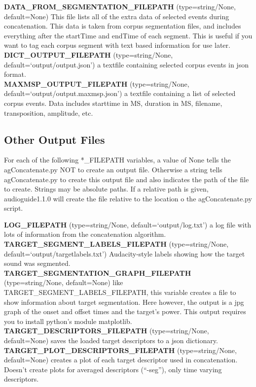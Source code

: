 \documentclass{article}
\newcommand{\optEntry}[4]{\textbf{#1} (type={\color{red}#2}, default={\color{ForestGreen}#3}) #4\hspace{0.5em}\\}
\newcommand{\ag}{audioguide1.1.0\xspace}
\begin{document}
\begin{spacing}{1.2}
\optEntry{DATA\_FROM\_SEGMENTATION\_FILEPATH}{string/None}{None}{This file lists all of the extra data of selected events during concatenation.  This data is taken from corpus segmentation files, and includes everything after the startTime and endTime of each segment.  This is useful if you want to tag each corpus segment with text based information for use later.}

\optEntry{DICT\_OUTPUT\_FILEPATH}{string/None}{`output/output.json'}{a textfile containing selected corpus events in json format.}

\optEntry{MAXMSP\_OUTPUT\_FILEPATH}{string/None}{`output/output.maxmsp.json'}{a textfile containing a list of selected corpus events.  Data includes starttime in MS, duration in MS, filename, transposition, amplitude, etc.}


\subsection{Other Output Files}\label{otheroutputfiles}
For each of the following *\_FILEPATH variables, a value of None tells the agConcatenate.py NOT to create an output file.  Otherwise a string tells agConcatenate.py to create this output file and also indicates the path of the file to create.  Strings may be absolute paths.  If a relative path is given, \ag will create the file relative to the location o the agConcatenate.py script.

\optEntry{LOG\_FILEPATH}{string/None}{`output/log.txt'}{a log file with lots of information from the concatenation algorithm.}

\optEntry{TARGET\_SEGMENT\_LABELS\_FILEPATH}{string/None}{`output/targetlabels.txt'}{Audacity-style labels showing how the target sound was segmented.}

\optEntry{TARGET\_SEGMENTATION\_GRAPH\_FILEPATH}{string/None}{None}{like TARGET\_SEGMENT\_LABELS\_FILEPATH, this variable creates a file to show information about target segmentation.  Here however, the output is a jpg graph of the onset and offset times and the target's power.  This output requires you to install python's module matplotlib.}

\optEntry{TARGET\_DESCRIPTORS\_FILEPATH}{string/None}{None}{saves the loaded target descriptors to a json dictionary.}

\optEntry{TARGET\_PLOT\_DESCRIPTORS\_FILEPATH}{string/None}{None}{creates a plot of each target descriptor used in concatenation.  Doesn't create plots for averaged descriptors (``-seg''), only time varying descriptors.}




\end{spacing}
\end{document}
